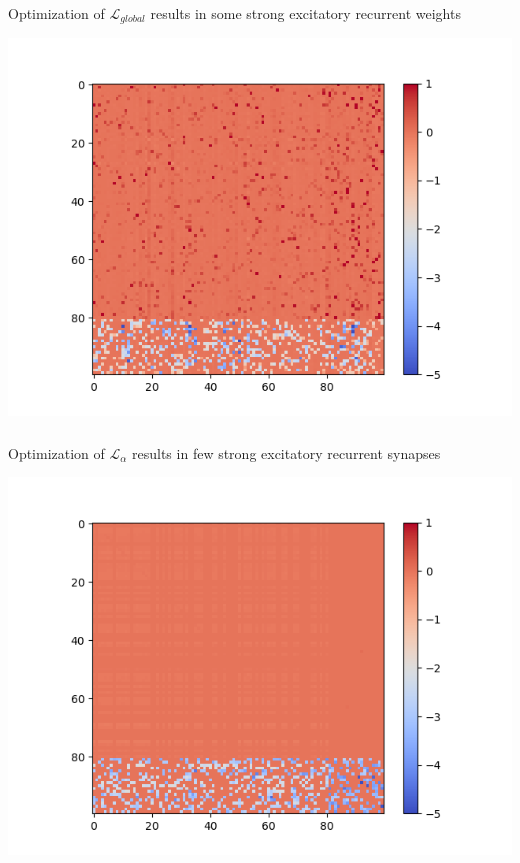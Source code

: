 \documentclass{beamer}
\begin{document}
\begin{frame}[plain]
\frametitle{} 

Optimization of $\mathcal{L}_{global}$ results in some strong excitatory recurrent weights

\begin{center}
\includegraphics[scale=0.5]{global-rec-weights}
\end{center}

\end{frame}

\begin{frame}[plain]
\frametitle{} 

Optimization of $\mathcal{L}_{\alpha}$ results in few strong excitatory recurrent synapses

\begin{center}
\includegraphics[scale=0.5]{alpha-rec-weights}
\end{center}

\end{frame}
\end{document}
